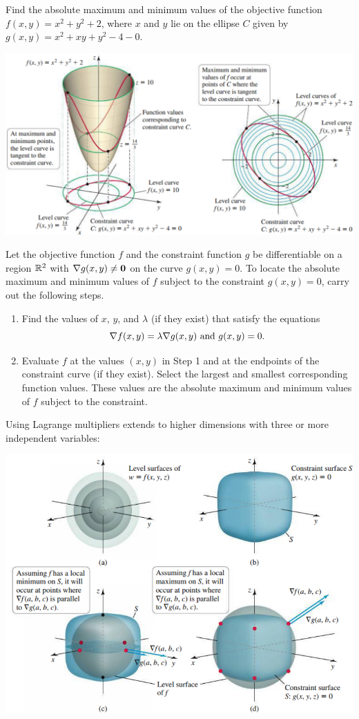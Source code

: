 \documentclass[mathNotesPreamble]{subfiles}
\begin{document}
  \begin{ex*}
    Find the absolute maximum and minimum values of the objective function $f(x,y)=x^2+y^2+2$, where $x$ and $y$ lie on the ellipse $C$ given by $g(x,y)=x^2+xy+y^2-4-0$.
  \end{ex*}
  \begin{flushright}
    \includegraphics[width=0.65\linewidth]{images/briggs_15_08/fig15_81}
  \end{flushright}
  \pagebreak

  \begin{thmBox*}
    Let the objective function $f$ and the constraint function $g$ be differentiable on a region $\mathbb{R}^2$ with $\nabla g(x,y)\neq\mathbf{0}$ on the curve $g(x,y)=0$. To locate the absolute maximum and minimum values of $f$ subject to the constraint $g(x,y)=0$, carry out the following steps.
    \begin{enumerate}
      \item 
        Find the values of $x$, $y$, and $\lambda$ (if they exist) that satisfy the equations
          \[\nabla f(x,y)=\lambda \nabla g(x,y) \textnormal{ and } g(x,y)=0.\]
      \item 
        Evaluate $f$ at the values $(x,y)$ in Step 1 and at the endpoints of the constraint curve (if they exist). Select the largest and smallest corresponding function values. These values are the absolute maximum and minimum values of $f$ subject to the constraint.
    \end{enumerate}
  \end{thmBox*}

  \noindent
  Using Lagrange multipliers extends to higher dimensions with three or more independent variables:
  \begin{center}
    \includegraphics[width=0.605\linewidth]{images/briggs_15_08/fig15_82}
  \end{center}
  \pagebreak
\end{document}
